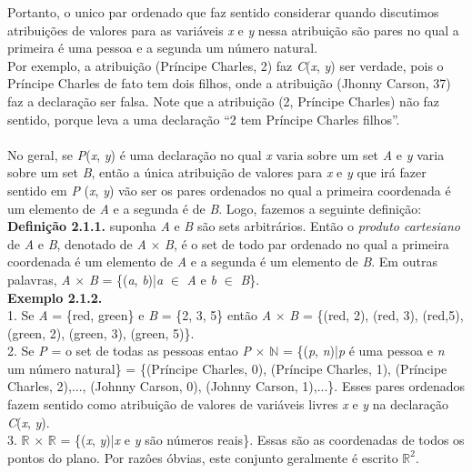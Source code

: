 Portanto, o unico par ordenado que faz sentido considerar quando discutimos atribuições de valores para as variáveis \textit{x} e
\textit{y} nessa atribuição são pares no qual a primeira é uma pessoa e a segunda um número natural.
\\
Por exemplo, a atribuição (Príncipe Charles, 2) faz \textit{C}(\textit{x}, \textit{y}) ser verdade, pois o Príncipe Charles de fato 
tem dois filhos, onde a atribuição (Jhonny Carson, 37) faz a declaração ser falsa. Note que a atribuição (2, Príncipe Charles) não 
faz sentido, porque leva a uma declaração ``2 tem Príncipe Charles filhos''. 
\\
\\
No geral, se \textit{P}(\textit{x}, \textit{y}) é uma declaração no qual \textit{x} varia sobre um set \textit{A} e \textit{y} varia
sobre um set \textit{B}, então a única atribuição de valores para \textit{x} e \textit{y} que irá fazer sentido em \textit{P}
(\textit{x}, \textit{y}) vão ser os pares ordenados no qual a primeira coordenada é um elemento de \textit{A} e a segunda é de
\textit{B}. Logo, fazemos a seguinte definição:
\\

\textbf{Definição 2.1.1.} suponha \textit{A} e \textit{B} são sets arbitrários. Então o \textit{produto cartesiano} de
\textit{A} e \textit{B}, denotado de \textit{A} $\times$ \textit{B}, é o set de todo par ordenado no qual a primeira 
coordenada é um elemento de \textit{A} e a segunda é um elemento de \textit{B}. Em outras palavras, 
\textit{A} $\times$ \textit {B} = \{(\textit{a}, \textit{b})|\textit{a} $\in$ \textit{A} e \textit{b} $\in$ \textit{B}\}.
\\

\textbf{Exemplo 2.1.2.}
\\
1. Se \textit{A} = \{red, green\} e \textit{B} = \{2, 3, 5\} então \textit{A} $\times$ \textit{B} = \{(red, 2), (red, 3), (red,5),
 (green, 2), (green, 3), (green, 5)\}.
\\
2. Se \textit{P} = o set de todas as pessoas  entao \textit{P} $\times$ $\mathbb{N}$ = \{(\textit{p}, \textit{n})|\textit{p} é uma 
pessoa e \textit{n} um número natural\} = \{(Príncipe Charles, 0), (Príncipe Charles, 1), (Príncipe Charles, 2),...,
(Johnny Carson, 0), (Johnny Carson, 1),...\}. Esses pares ordenados fazem sentido como atribuição de valores de variáveis livres
\textit{x} e \textit{y} na declaração \textit{C}(\textit{x}, \textit{y}).
\\
3. $\mathbb{R}$ $\times$ $\mathbb{R}$ = \{(\textit{x}, \textit{y})|\textit{x} e \textit{y} são números reais\}. Essas são as 
coordenadas de todos os pontos do plano. Por razôes óbvias, este conjunto geralmente é escrito $\mathbb{R}^2$.
\\
\\

